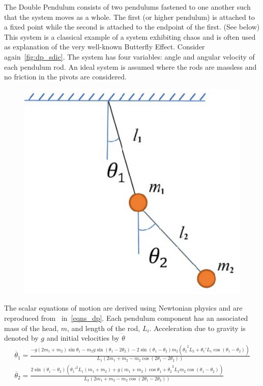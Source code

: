 \documentclass[a4paper,12pt,twoside]{report}
\begin{document}
The Double Pendulum consists of two pendulums fastened to one another such that the system moves as a whole. The first (or higher pendulum) is attached to a fixed point while the second is attached to the endpoint of the first. (See below)
This system is a classical example of a system exhibiting chaos and is often used as explanation of the very well-known Butterfly Effect.  Consider again~\ref{fig:dp_sdic}.
The system has four variables: angle and angular velocity of each pendulum rod. An ideal system is assumed where the rods are massless and no friction in the pivots are considered.
\begin{figure}[ht]
  \includegraphics[scale=0.35]{_dp_setup.eps}
  \centering
  \label{fig:dp_setup}
\end{figure}

The scalar equations of motion are derived using Newtonian physics and are reproduced from~\cite{DPFormulas} in~\ref{eqns_dp}. Each pendulum component has an associated mass of the head, $m$, and length of the rod, $L_i$. Acceleration due to gravity is denoted by $g$ and initial velocities by $\dot{\theta}$
\begin{eqnarray}\label{eqns_dp}
  \ddot{\theta_{1}}  = \frac{-g(2m_1+m_2)\sin{\theta_1} - m_2g\sin(\theta_1-2\theta_2) - 2\sin(\theta_1-\theta_2)m_2({\dot{\theta_{2}}}^{2}L_2 + {\theta_{1}'}L_1\cos(\theta_1-\theta_2))} {L_1(2m_1 + m_2 -m_2\cos(2\theta_1 - 2\theta_2))}
  \\
  \ddot{\theta_{2}} = \frac{2\sin(\theta_1-\theta_2)(\theta_{1}'^{2}L_1(m_1+m_2) + g(m_1+m_2)\cos\theta_1 + \dot{\theta_{2}}^{2}L_2m_2\cos(\theta_1-\theta_2))}{L_2(2m_1 + m_2 -m_2\cos(2\theta_1 - 2\theta_2))}
\end{eqnarray}
\end{document}
